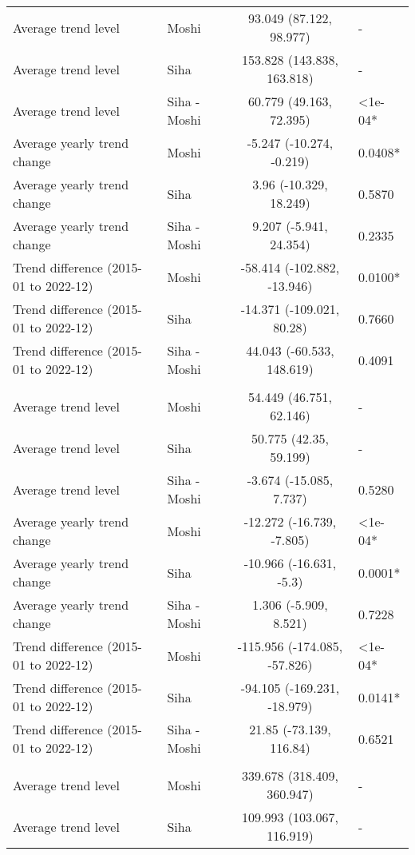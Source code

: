 \begin{longtable}{l|lcl}
Average trend level & Moshi & 93.049 (87.122, 98.977) & - \\ 
Average trend level & Siha & 153.828 (143.838, 163.818) & - \\ 
Average trend level & Siha - Moshi & 60.779 (49.163, 72.395) & <1e-04* \\ 
Average yearly trend change & Moshi & -5.247 (-10.274, -0.219) & 0.0408* \\ 
Average yearly trend change & Siha & 3.96 (-10.329, 18.249) & 0.5870 \\ 
Average yearly trend change & Siha - Moshi & 9.207 (-5.941, 24.354) & 0.2335 \\ 
Trend difference (2015-01 to 2022-12) & Moshi & -58.414 (-102.882, -13.946) & 0.0100* \\ 
Trend difference (2015-01 to 2022-12) & Siha & -14.371 (-109.021, 80.28) & 0.7660 \\ 
Trend difference (2015-01 to 2022-12) & Siha - Moshi & 44.043 (-60.533, 148.619) & 0.4091 \\ 
\midrule\addlinespace[2.5pt]
\multicolumn{4}{l}{Malnutrition} \\[2.5pt] 
\midrule\addlinespace[2.5pt]
Average trend level & Moshi & 54.449 (46.751, 62.146) & - \\ 
Average trend level & Siha & 50.775 (42.35, 59.199) & - \\ 
Average trend level & Siha - Moshi & -3.674 (-15.085, 7.737) & 0.5280 \\ 
Average yearly trend change & Moshi & -12.272 (-16.739, -7.805) & <1e-04* \\ 
Average yearly trend change & Siha & -10.966 (-16.631, -5.3) & 0.0001* \\ 
Average yearly trend change & Siha - Moshi & 1.306 (-5.909, 8.521) & 0.7228 \\ 
Trend difference (2015-01 to 2022-12) & Moshi & -115.956 (-174.085, -57.826) & <1e-04* \\ 
Trend difference (2015-01 to 2022-12) & Siha & -94.105 (-169.231, -18.979) & 0.0141* \\ 
Trend difference (2015-01 to 2022-12) & Siha - Moshi & 21.85 (-73.139, 116.84) & 0.6521 \\ 
\midrule\addlinespace[2.5pt]
\multicolumn{4}{l}{Neurological} \\[2.5pt] 
\midrule\addlinespace[2.5pt]
Average trend level & Moshi & 339.678 (318.409, 360.947) & - \\ 
Average trend level & Siha & 109.993 (103.067, 116.919) & - \\ 

\end{longtable}
